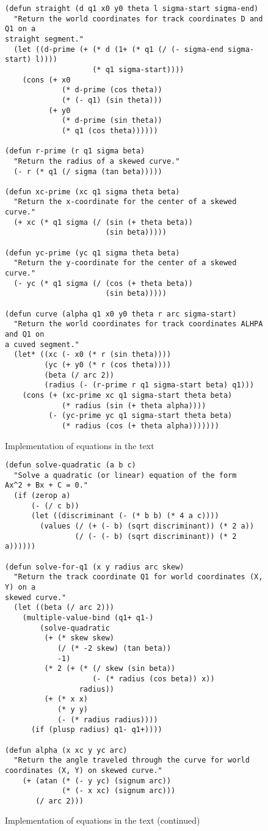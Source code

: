\documentclass{article}
\begin{document}
\begin{figure}
  \centering
\begin{verbatim}
(defun straight (d q1 x0 y0 theta l sigma-start sigma-end)
  "Return the world coordinates for track coordinates D and Q1 on a
straight segment."
  (let ((d-prime (+ (* d (1+ (* q1 (/ (- sigma-end sigma-start) l))))
                    (* q1 sigma-start))))
    (cons (+ x0 
             (* d-prime (cos theta)) 
             (* (- q1) (sin theta)))
          (+ y0
             (* d-prime (sin theta))
             (* q1 (cos theta))))))

(defun r-prime (r q1 sigma beta)
  "Return the radius of a skewed curve."
  (- r (* q1 (/ sigma (tan beta)))))

(defun xc-prime (xc q1 sigma theta beta)
  "Return the x-coordinate for the center of a skewed curve."
  (+ xc (* q1 sigma (/ (sin (+ theta beta))
                       (sin beta)))))

(defun yc-prime (yc q1 sigma theta beta)
  "Return the y-coordinate for the center of a skewed curve."
  (- yc (* q1 sigma (/ (cos (+ theta beta))
                       (sin beta)))))

(defun curve (alpha q1 x0 y0 theta r arc sigma-start)
  "Return the world coordinates for track coordinates ALHPA and Q1 on
a cuved segment."
  (let* ((xc (- x0 (* r (sin theta))))
         (yc (+ y0 (* r (cos theta))))
         (beta (/ arc 2))
         (radius (- (r-prime r q1 sigma-start beta) q1)))
    (cons (+ (xc-prime xc q1 sigma-start theta beta)
             (* radius (sin (+ theta alpha))))
          (- (yc-prime yc q1 sigma-start theta beta) 
             (* radius (cos (+ theta alpha)))))))
\end{verbatim}
\caption{Implementation of equations in the text}
\end{figure}

\begin{figure}
  \centering
\begin{verbatim}
(defun solve-quadratic (a b c)
  "Solve a quadratic (or linear) equation of the form 
Ax^2 + Bx + C = 0."
  (if (zerop a)
      (- (/ c b))
      (let ((discriminant (- (* b b) (* 4 a c))))
        (values (/ (+ (- b) (sqrt discriminant)) (* 2 a))
                (/ (- (- b) (sqrt discriminant)) (* 2 a))))))

(defun solve-for-q1 (x y radius arc skew)
  "Return the track coordinate Q1 for world coordinates (X, Y) on a
skewed curve."
  (let ((beta (/ arc 2)))
    (multiple-value-bind (q1+ q1-)
        (solve-quadratic
         (+ (* skew skew) 
            (/ (* -2 skew) (tan beta)) 
            -1)
         (* 2 (+ (* (/ skew (sin beta))
                    (- (* radius (cos beta)) x))
                 radius))
         (+ (* x x) 
            (* y y)
            (- (* radius radius))))
      (if (plusp radius) q1- q1+))))

(defun alpha (x xc y yc arc)
  "Return the angle traveled through the curve for world
coordinates (X, Y) on skewed curve."
    (+ (atan (* (- y yc) (signum arc))
             (* (- x xc) (signum arc)))
       (/ arc 2)))
\end{verbatim}
\caption{Implementation of equations in the text (continued)}
\end{figure}
\end{document}
